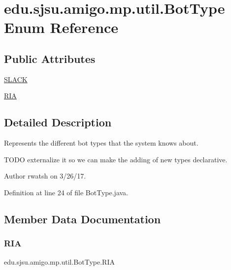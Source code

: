 \hypertarget{enumedu_1_1sjsu_1_1amigo_1_1mp_1_1util_1_1_bot_type}{}\section{edu.\+sjsu.\+amigo.\+mp.\+util.\+Bot\+Type Enum Reference}
\label{enumedu_1_1sjsu_1_1amigo_1_1mp_1_1util_1_1_bot_type}
\subsection*{Public Attributes}
\begin{DoxyCompactItemize}
\item 
\hyperlink{enumedu_1_1sjsu_1_1amigo_1_1mp_1_1util_1_1_bot_type_a639fbb7486fe688b082dfc1744ebb81e}{S\+L\+A\+CK}
\item 
\hyperlink{enumedu_1_1sjsu_1_1amigo_1_1mp_1_1util_1_1_bot_type_ac89f2fa038fac3e35176cf41318a4f46}{R\+IA}
\end{DoxyCompactItemize}


\subsection{Detailed Description}
Represents the different bot types that the system knows about.

T\+O\+DO externalize it so we can make the adding of new types declarative.

\begin{DoxyAuthor}{Author}
rwatsh on 3/26/17. 
\end{DoxyAuthor}


Definition at line 24 of file Bot\+Type.\+java.



\subsection{Member Data Documentation}
\mbox{\label{enumedu_1_1sjsu_1_1amigo_1_1mp_1_1util_1_1_bot_type_ac89f2fa038fac3e35176cf41318a4f46}} 
\subsubsection{\texorpdfstring{R\+IA}{RIA}}
{\footnotesize\ttfamily edu.\+sjsu.\+amigo.\+mp.\+util.\+Bot\+Type.\+R\+IA}




